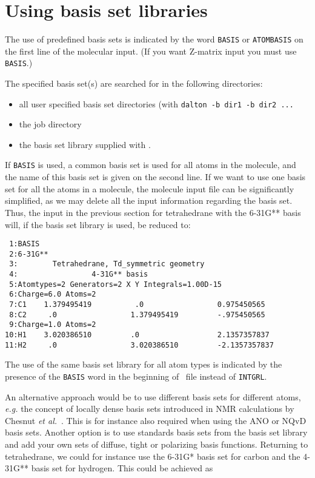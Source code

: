 \section{Using basis set libraries}\label{sec:molbasis}

The use of predefined basis sets is indicated
by the word {\tt BASIS} or {\tt ATOMBASIS} on the first line of the
molecular input.
(If you want Z-matrix input you must use {\tt BASIS}.)

The specified basis set(s) are searched for in the following directories:
\begin{itemize}
\item all user specified basis set directories (with {\tt dalton -b dir1 -b dir2 ...}
\item the job directory
\item the basis set library supplied with \dalton.
\end{itemize}

If {\tt BASIS} is used, a common basis set is used for all atoms in
the molecule, and the name of this basis set is given on the second line.
If we want to use one basis set for all the
atoms in a molecule, the molecule input file can be significantly
simplified, as we may delete all the input information regarding the
basis set. Thus, the input in the previous section for tetrahedrane
with the 6-31G** basis will, if the basis set library is used,  be reduced
to:

\begin{verbatim}
 1:BASIS
 2:6-31G**
 3:        Tetrahedrane, Td_symmetric geometry
 4:                 4-31G** basis
 5:Atomtypes=2 Generators=2 X Y Integrals=1.00D-15
 6:Charge=6.0 Atoms=2
 7:C1    1.379495419          .0                 0.975450565
 8:C2     .0                 1.379495419         -.975450565
 9:Charge=1.0 Atoms=2
10:H1    3.020386510         .0                  2.1357357837
11:H2     .0                 3.020386510         -2.1357357837
\end{verbatim}

The use of the same basis set library for all atom types is indicated by the presence of the
\verb|BASIS| word in the beginning of \molinp\ file instead of
\verb|INTGRL|.

An alternative approach would be to use different basis sets for
different atoms, {\it e.g.\/} the concept of locally
dense basis sets
introduced in NMR calculations by Chesnut {\it et
al.\/}~\cite{dbcberkdmdaejcc14}. This is for instance also required
when using the ANO or
NQvD
basis sets. Another option is to use
standards basis sets from the basis set 
library and add your own sets
of diffuse, tight or polarizing basis
functions. Returning to
tetrahedrane, we could for instance use the 6-31G* basis set for
carbon and the 4-31G** basis set for hydrogen. This could be achieved
as

